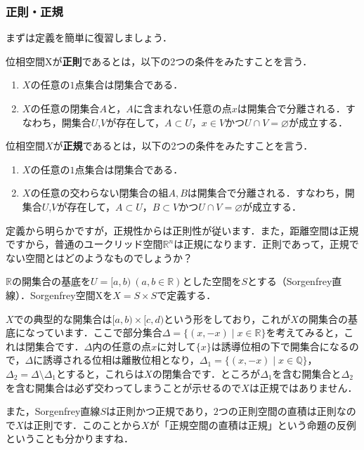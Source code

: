\subsubsection*{正則・正規}
まずは定義を簡単に復習しましょう．
\begin{defm}[正則空間]
位相空間Xが{\bf 正則}であるとは，以下の2つの条件をみたすことを言う．
\begin{enumerate}
\item $X$の任意の$1$点集合は閉集合である．
\item $X$の任意の閉集合$A$と，$A$に含まれない任意の点$x$は開集合で分離される．すなわち，開集合$U$,$V$が存在して，$A\subset U$，$x\in V$かつ$U\cap V=\varnothing$が成立する．
\end{enumerate}
\end{defm}
\begin{defm}[正規空間]
位相空間$X$が{\bf 正規}であるとは，以下の2つの条件をみたすことを言う．
\begin{enumerate}
\item $X$の任意の$1$点集合は閉集合である．
\item $X$の任意の交わらない閉集合の組$A,B$は開集合で分離される．すなわち，開集合$U$,$V$が存在して，$A\subset U$，$B\subset V$かつ$U\cap V=\varnothing$が成立する．
\end{enumerate}
\end{defm}
定義から明らかですが，正規性からは正則性が従います．また，距離空間は正規ですから，普通のユークリッド空間$\mathbb{R}^n$は正規になります．正則であって，正規でない空間とはどのようなものでしょうか？
\begin{exm}[Sorgenfrey空間]
$\mathbb{R}$の開集合の基底を$U=[a,b)\ (a,b\in\mathbb{R})$とした空間を$S$とする（Sorgenfrey直線）．Sorgenfrey空間Xを$X=S\times S$で定義する．
\end{exm}
$X$での典型的な開集合は$[a,b)\times[c,d)$という形をしており，これが$X$の開集合の基底になっています．ここで部分集合$\Delta=\{(x,-x)\mid x\in\mathbb{R}\}$を考えてみると，これは閉集合です．$\Delta$内の任意の点$x$に対して$\{ x \}$は誘導位相の下で開集合になるので，$\Delta$に誘導される位相は離散位相となり，$\Delta_1=\{(x,-x)\mid x\in\mathbb{Q}\}$，$\Delta_2=\Delta\setminus\Delta_1$とすると，これらは$X$の閉集合です．ところが$\Delta_1$を含む開集合と$\Delta_2$を含む開集合は必ず交わってしまうことが示せるので$X$は正規ではありません．\par
また，Sorgenfrey直線$S$は正則かつ正規であり，$2$つの正則空間の直積は正則なので$X$は正則です．このことから$X$が「正規空間の直積は正規」という命題の反例ということも分かりますね．\par
